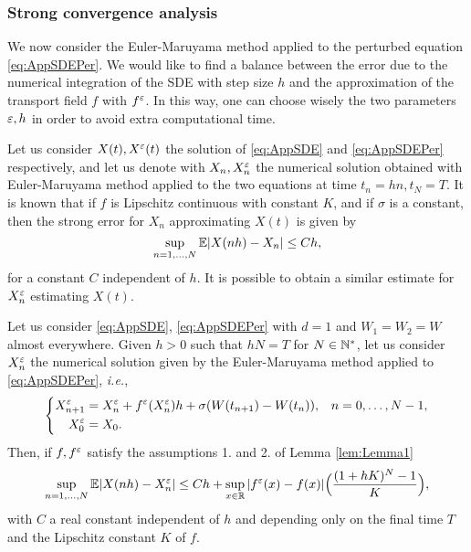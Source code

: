 \subsubsection{Strong convergence analysis}

We now consider the Euler-Maruyama method applied to the perturbed equation \eqref{eq:AppSDEPer}. We would like to find a balance between the error due to the numerical integration of the SDE with step size $h$ and the approximation of the transport field $f$ with $f^\varepsilon$. In this way, one can choose wisely the two parameters $\varepsilon, h$ in order to avoid extra computational time.

\noindent Let us consider $X(t), X^\varepsilon(t)$ the solution of \eqref{eq:AppSDE} and \eqref{eq:AppSDEPer} respectively, and let us denote with $X_n, X_n^\varepsilon$ the numerical solution obtained with Euler-Maruyama method applied to the two equations at time $t_n = hn, t_N = T$. It is known that if $f$ is Lipschitz continuous with constant $K$, and if $\sigma$ is a constant, then the strong error for $X_n$ approximating $X(t)$ is given by
\begin{equation}\label{eq:StrongEM}
	\sup_{n = 1, \dots, N} \mathbb{E} |X(nh) - X_n| \leq C h,
\end{equation}
for a constant $C$ independent of $h$. It is possible to obtain a similar estimate for $X_n^\varepsilon$ estimating $X(t)$. 
\begin{theorem} Let us consider \eqref{eq:AppSDE}, \eqref{eq:AppSDEPer} with $d = 1$ and $W_1 = W_2 = W$ almost everywhere. Given $h > 0$ such that $hN = T$ for $N \in \mathbb{N}^*$, let us consider $X_n^\varepsilon$ the numerical solution given by the Euler-Maruyama method applied to \eqref{eq:AppSDEPer}, \textit{i.e.},
\begin{equation*}
\left \{
\begin{aligned}
	X^\varepsilon_{n+1} &= X^\varepsilon_n + f^\varepsilon(X^\varepsilon_n)h + \sigma (W(t_{n+1}) - W(t_n)), && n = 0, \dots, N - 1, \\
	X^\varepsilon_0 &= X_0.
\end{aligned} \right .
\end{equation*}
Then, if $f, f^\varepsilon$ satisfy the assumptions 1. and 2. of Lemma \ref{lem:Lemma1}
\begin{equation}\label{eq:StrongConvEpl}
	\sup_{n = 1, \dots, N} \mathbb{E} |X(nh) - X^\varepsilon_n| \leq C h + \sup_{x \in \mathbb{R}} |f^\varepsilon(x) - f(x)| \Big(\frac{(1+hK)^N - 1}{K}\Big), 
\end{equation}
with $C$ a real constant independent of $h$ and depending only on the final time $T$ and the Lipschitz constant $K$ of $f$.
\end{theorem}


